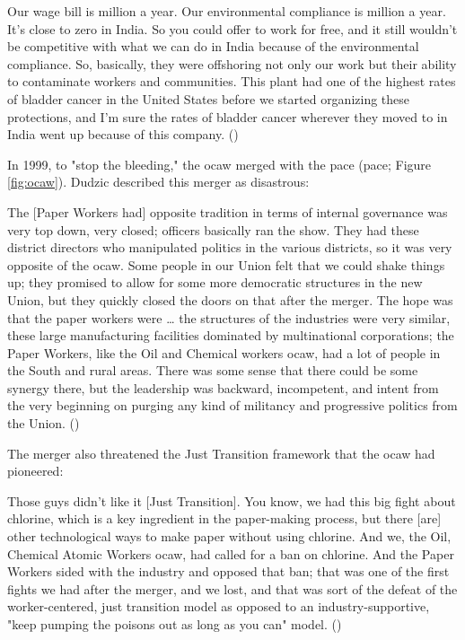 \documentclass[12pt]{article}
\renewenvironment{quote}
  {\list{}{\leftmargin=\parindent\rightmargin=0pt}%
   \item\relax}
  {\endlist}
\begin{document}
\begin{quote}
Our wage bill is  million a year. Our environmental compliance is  million a year. It's close to zero in India. So you could offer to work for free, and it still wouldn't be competitive with what we can do in India because of the environmental compliance. So, basically, they were offshoring not only our work but their ability to contaminate workers and communities. This plant had one of the highest rates of bladder cancer in the United States before we started organizing these protections, and I'm sure the rates of bladder cancer wherever they moved to in India went up because of this company. (\citeyear{dudzicInterview2024})
\end{quote}

In 1999, to "stop the bleeding," the \acrshort{ocaw} merged with the \acrlong{pace} (\acrshort{pace}; Figure \ref{fig:ocaw}). Dudzic described this merger as disastrous:

\begin{quote}
The [Paper Workers had] opposite tradition in terms of internal governance was very top down, very closed; officers basically ran the show. They had these district directors who manipulated politics in the various districts, so it was very opposite of the \acrshort{ocaw}. Some people in our Union felt that we could shake things up; they promised to allow for some more democratic structures in the new Union, but they quickly closed the doors on that after the merger. The hope was that the paper workers were … the structures of the industries were very similar, these large manufacturing facilities dominated by multinational corporations; the Paper Workers, like the Oil and Chemical workers \acrshort{ocaw}, had a lot of people in the South and rural areas. There was some sense that there could be some synergy there, but the leadership was backward, incompetent, and intent from the very beginning on purging any kind of militancy and progressive politics from the Union. (\citeyear{dudzicInterview2024})
\end{quote}

\noindent The merger also threatened the Just Transition framework that the \acrshort{ocaw} had pioneered:

\begin{quote}
Those guys didn't like it [Just Transition]. You know, we had this big fight about chlorine, which is a key ingredient in the paper-making process, but there [are] other technological ways to make paper without using chlorine. And we, the Oil, Chemical Atomic Workers \acrshort{ocaw}, had called for a ban on chlorine. And the Paper Workers sided with the industry and opposed that ban; that was one of the first fights we had after the merger, and we lost, and that was sort of the defeat of the worker-centered, just transition model as opposed to an industry-supportive, "keep pumping the poisons out as long as you can" model. (\citeyear{dudzicInterview2024})
\end{quote}
\end{document}
